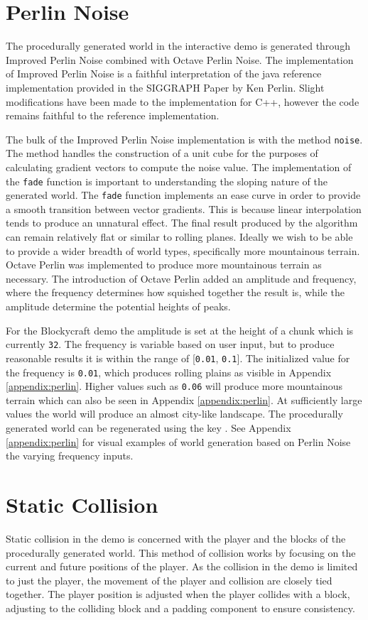 \documentclass{book}
\newcommand{\Blockycraft}{Blockycraft}
\begin{document}
\section{Perlin Noise}
The procedurally generated world in the interactive demo is generated through Improved Perlin Noise combined with Octave Perlin Noise.  The implementation of Improved Perlin Noise is a faithful interpretation of the java reference implementation provided in the SIGGRAPH Paper by Ken Perlin.  Slight modifications have been made to the implementation for C++, however the code remains faithful to the reference implementation.

The bulk of the Improved Perlin Noise implementation is with the method \texttt{noise}.  The method handles the construction of a unit cube for the purposes of calculating gradient vectors to compute the noise value.  The implementation of the \texttt{fade} function is important to understanding the sloping nature of the generated world.  The \texttt{fade} function implements an ease curve in order to provide a smooth transition between vector gradients.  This is because linear interpolation tends to produce an unnatural effect. The final result produced by the algorithm can remain relatively flat or similar to rolling planes.  Ideally we wish to be able to provide a wider breadth of world types, specifically more mountainous terrain.  Octave Perlin was implemented to produce more mountainous terrain as necessary.  The introduction of Octave Perlin added an amplitude and frequency, where the frequency determines how squished together the result is, while the amplitude determine the potential heights of peaks.
    
For the \Blockycraft{} demo the amplitude is set at the height of a chunk which is currently \texttt{32}.  The frequency is variable based on user input, but to produce reasonable results it is within the range of [\texttt{0.01}, \texttt{0.1}].  The initialized value for the frequency is \texttt{0.01}, which produces rolling plains as visible in Appendix \ref{appendix:perlin}.  Higher values such as \texttt{0.06} will produce more mountainous terrain which can also be seen in Appendix \ref{appendix:perlin}.  At sufficiently large values the world will produce an almost city-like landscape.
\vskip 2.5mm\noindent
The procedurally generated world can be regenerated using the key .  See Appendix \ref{appendix:perlin} for visual examples of world generation based on Perlin Noise the varying frequency inputs.
    
\section{Static Collision}
Static collision in the demo is concerned with the player and the blocks of the procedurally generated world.  This method of collision works by focusing on the current and future positions of the player.  As the collision in the demo is limited to just the player, the movement of the player and collision are closely tied together.  The player position is adjusted when the player collides with a block, adjusting to the colliding block and a padding component to ensure consistency.
\end{document}
